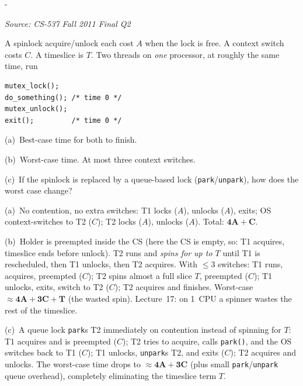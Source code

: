 \documentclass[11pt,a4paper]{article}
\makeatletter
\newcommand{\keepspace}[1]{\par\penalty-100\begingroup
  \setlength{\dimen@}{#1}\dimen@ii\pagegoal\advance\dimen@ii-\pagetotal
  \ifdim\dimen@>\dimen@ii\ifdim\dimen@ii>\z@\vfil\fi\break\fi\endgroup}
\newcounter{qn}[section]
\newenvironment{Qn}[4]{%
  \refstepcounter{qn}\keepspace{7\baselineskip}%
  \begin{tcolorbox}[qboxstyle, title={Q\thesection.\theqn\ \ [#1 \textbar\ #2]\ \ #4}]%
  {\footnotesize\color{g3}\textit{Source: #3}}\par\smallskip%
}{%
  \end{tcolorbox}%
}
\newenvironment{Sol}{%
  \begin{tcolorbox}[sboxstyle, title={Solution}]%
}{%
  \end{tcolorbox}\vspace{0.35em}%
}
\makeatother
\begin{document}
\begin{Qn}{Hard}{Lect 17}{CS-537 Fall 2011 Final Q2}{Best- and worst-case time of a spinlock on one CPU}
A spinlock acquire/unlock each cost $A$ when the lock is free. A context switch costs $C$. A timeslice is $T$. Two threads on \emph{one} processor, at roughly the same time, run

\begin{lstlisting}[numbers=none]
mutex_lock();
do_something(); /* time 0 */
mutex_unlock();
exit();         /* time 0 */
\end{lstlisting}

(a)~Best-case time for both to finish.

(b)~Worst-case time. At most three context switches.

(c)~If the spinlock is replaced by a queue-based lock (\texttt{park}/\texttt{unpark}), how does the worst case change?
\end{Qn}
\begin{Sol}
(a)~No contention, no extra switches: T1 locks ($A$), unlocks ($A$), exits; OS context-switches to T2 ($C$); T2 locks ($A$), unlocks ($A$). Total: $\mathbf{4A + C}$.

(b)~Holder is preempted inside the CS (here the CS is empty, so: T1 acquires, timeslice ends before unlock). T2 runs and \emph{spins for up to $T$} until T1 is rescheduled, then T1 unlocks, then T2 acquires. With $\le 3$ switches:
T1 runs, acquires, preempted ($C$);
T2 spins almost a full slice $T$, preempted ($C$);
T1 unlocks, exits, switch to T2 ($C$);
T2 acquires and finishes.
Worst-case $\approx \mathbf{4A + 3C + T}$ (the wasted spin). Lecture~17: on 1~CPU a spinner wastes the rest of the timeslice.

(c)~A queue lock \texttt{park}s T2 immediately on contention instead of spinning for $T$: T1 acquires and is preempted ($C$); T2 tries to acquire, calls \texttt{park()}, and the OS switches back to T1 ($C$); T1 unlocks, \texttt{unpark}s T2, and exits ($C$); T2 acquires and unlocks. The worst-case time drops to $\approx \mathbf{4A + 3C}$ (plus small \texttt{park}/\texttt{unpark} queue overhead), completely eliminating the timeslice term $T$.
\end{Sol}
\end{document}
